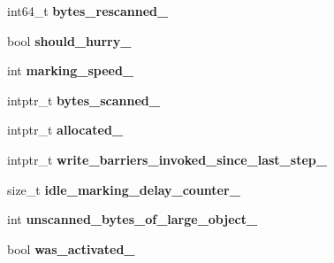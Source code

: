 \begin{DoxyCompactItemize}
\item 
int64\+\_\+t {\bfseries bytes\+\_\+rescanned\+\_\+}\hypertarget{classv8_1_1internal_1_1_incremental_marking_a68d6607720aae90ac586c547fe9f6cfc}{}\label{classv8_1_1internal_1_1_incremental_marking_a68d6607720aae90ac586c547fe9f6cfc}

\item 
bool {\bfseries should\+\_\+hurry\+\_\+}\hypertarget{classv8_1_1internal_1_1_incremental_marking_a4b2f810951b66de2fd23529e137ba65e}{}\label{classv8_1_1internal_1_1_incremental_marking_a4b2f810951b66de2fd23529e137ba65e}

\item 
int {\bfseries marking\+\_\+speed\+\_\+}\hypertarget{classv8_1_1internal_1_1_incremental_marking_a7f80555b1c3d5d64931f6b34b78cee1c}{}\label{classv8_1_1internal_1_1_incremental_marking_a7f80555b1c3d5d64931f6b34b78cee1c}

\item 
intptr\+\_\+t {\bfseries bytes\+\_\+scanned\+\_\+}\hypertarget{classv8_1_1internal_1_1_incremental_marking_abda10c4e09264f27b6f1a8bebf622dda}{}\label{classv8_1_1internal_1_1_incremental_marking_abda10c4e09264f27b6f1a8bebf622dda}

\item 
intptr\+\_\+t {\bfseries allocated\+\_\+}\hypertarget{classv8_1_1internal_1_1_incremental_marking_aa465895f747d0b32849a8b9df7ef401a}{}\label{classv8_1_1internal_1_1_incremental_marking_aa465895f747d0b32849a8b9df7ef401a}

\item 
intptr\+\_\+t {\bfseries write\+\_\+barriers\+\_\+invoked\+\_\+since\+\_\+last\+\_\+step\+\_\+}\hypertarget{classv8_1_1internal_1_1_incremental_marking_a72a11649dbdb8b6aaec3923f8a483e33}{}\label{classv8_1_1internal_1_1_incremental_marking_a72a11649dbdb8b6aaec3923f8a483e33}

\item 
size\+\_\+t {\bfseries idle\+\_\+marking\+\_\+delay\+\_\+counter\+\_\+}\hypertarget{classv8_1_1internal_1_1_incremental_marking_a3e7d29039db803ee81041963211f2ba7}{}\label{classv8_1_1internal_1_1_incremental_marking_a3e7d29039db803ee81041963211f2ba7}

\item 
int {\bfseries unscanned\+\_\+bytes\+\_\+of\+\_\+large\+\_\+object\+\_\+}\hypertarget{classv8_1_1internal_1_1_incremental_marking_a0cc07487ed284e957ecf7992e826550a}{}\label{classv8_1_1internal_1_1_incremental_marking_a0cc07487ed284e957ecf7992e826550a}

\item 
bool {\bfseries was\+\_\+activated\+\_\+}\hypertarget{classv8_1_1internal_1_1_incremental_marking_a93f3d11950a46d825fe1134664f7c494}{}\label{classv8_1_1internal_1_1_incremental_marking_a93f3d11950a46d825fe1134664f7c494}


\end{DoxyCompactItemize}
